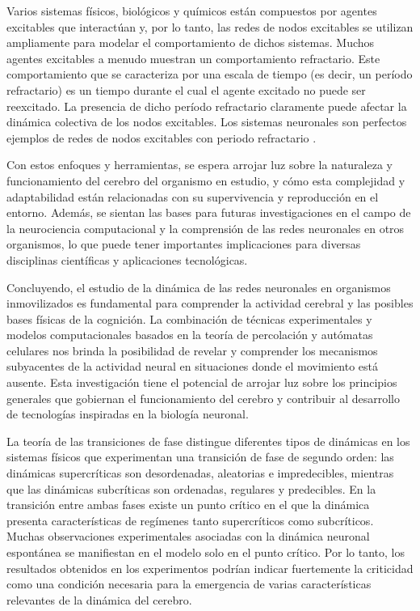 Varios sistemas físicos, biológicos y químicos están compuestos por agentes excitables que interactúan y, por lo tanto, las redes de nodos excitables se utilizan ampliamente para modelar el comportamiento de dichos sistemas. Muchos agentes excitables a menudo muestran un comportamiento refractario. Este comportamiento que se caracteriza por una escala de tiempo (es decir, un período refractario) es un tiempo durante el cual el agente excitado no puede ser reexcitado. La presencia de dicho período refractario claramente puede afectar la dinámica colectiva de los nodos excitables. Los sistemas neuronales son perfectos ejemplos de redes de nodos excitables con periodo refractario \cite{moosavi_refractory_2017}.




Con estos enfoques y herramientas, se espera arrojar luz sobre la naturaleza y funcionamiento del cerebro del organismo en estudio, y cómo esta complejidad y adaptabilidad están relacionadas con su supervivencia y reproducción en el entorno. Además, se sientan las bases para futuras investigaciones en el campo de la neurociencia computacional y la comprensión de las redes neuronales en otros organismos, lo que puede tener importantes implicaciones para diversas disciplinas científicas y aplicaciones tecnológicas.

Concluyendo, el estudio de la dinámica de las redes neuronales en organismos inmovilizados es fundamental para comprender la actividad cerebral y las posibles bases físicas de la cognición. La combinación de técnicas experimentales y modelos computacionales basados en la teoría de percolación y autómatas celulares nos brinda la posibilidad de revelar y comprender los mecanismos subyacentes de la actividad neural en situaciones donde el movimiento está ausente. Esta investigación tiene el potencial de arrojar luz sobre los principios generales que gobiernan el funcionamiento del cerebro y contribuir al desarrollo de tecnologías inspiradas en la biología neuronal.

La teoría de las transiciones de fase distingue diferentes tipos de dinámicas en los sistemas físicos que experimentan una transición de fase de segundo orden: las dinámicas supercríticas son desordenadas, aleatorias e impredecibles, mientras que las dinámicas subcríticas son ordenadas, regulares y predecibles. En la transición entre ambas fases existe un punto crítico en el que la dinámica presenta características de regímenes tanto supercríticos como subcríticos. Muchas observaciones experimentales asociadas con la dinámica neuronal espontánea se manifiestan en el modelo solo en el punto crítico. Por lo tanto, los resultados obtenidos en los experimentos podrían indicar fuertemente la criticidad como una condición necesaria para la emergencia de varias características relevantes de la dinámica del cerebro.


